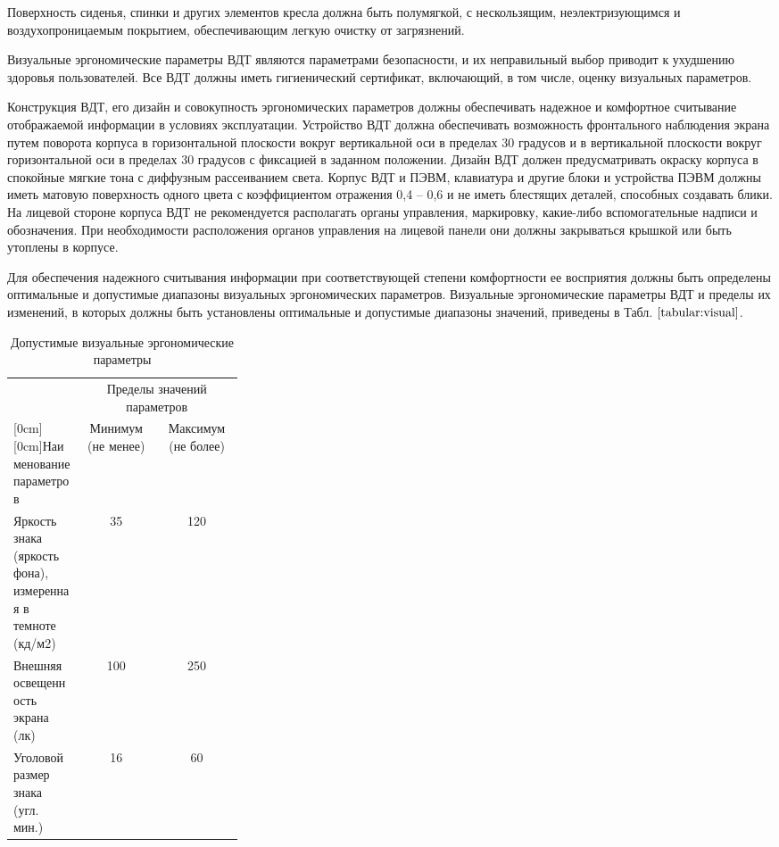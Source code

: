 \documentclass[12pt,a4paper]{report}
\begin{document}
Поверхность сиденья, спинки и других элементов кресла должна быть полумягкой, с нескользящим, неэлектризующимся и воздухопроницаемым покрытием, обеспечивающим легкую очистку от загрязнений. 

Визуальные эргономические параметры ВДТ являются параметрами безопасности, и их неправильный выбор приводит к ухудшению здоровья пользователей. Все ВДТ должны иметь гигиенический сертификат, включающий, в том числе, оценку визуальных параметров. 

Конструкция ВДТ, его дизайн и совокупность эргономических параметров должны обеспечивать надежное и комфортное считывание отображаемой информации в условиях эксплуатации. Устройство ВДТ должна обеспечивать возможность фронтального наблюдения экрана путем поворота корпуса в горизонтальной плоскости вокруг вертикальной оси в пределах  30 градусов и в вертикальной плоскости вокруг горизонтальной оси в пределах   30 градусов с фиксацией в заданном положении. Дизайн ВДТ должен предусматривать окраску корпуса в спокойные мягкие тона с диффузным рассеиванием света. Корпус ВДТ и ПЭВМ, клавиатура и другие блоки и устройства ПЭВМ должны иметь матовую поверхность одного цвета с коэффициентом отражения 0,4 – 0,6 и не иметь блестящих деталей, способных создавать блики. На лицевой стороне корпуса ВДТ не рекомендуется располагать органы управления, маркировку, какие-либо вспомогательные надписи и обозначения. При необходимости расположения органов управления на лицевой панели они должны закрываться крышкой или быть утоплены в корпусе.

Для обеспечения надежного считывания информации при соответствующей степени комфортности ее восприятия должны быть определены оптимальные и допустимые диапазоны визуальных эргономических параметров. Визуальные эргономические параметры ВДТ и пределы их изменений, в которых должны быть установлены оптимальные и допустимые диапазоны значений, приведены в Табл. $\ref{tabular:visual}$.

\begin{table} [H]
\label{tabular:visual}
\begin{center}
\begin{tabular}{|p{0.3\linewidth}|c|c|}
\hline
& \multicolumn{2}{c|}{Пределы значений параметров} \\
\cline{2-3}
\raisebox{1.5ex}[0cm][0cm]{Наименование параметров}
& Минимум (не менее) & Максимум (не более) \\
\hline
Яркость знака (яркость фона), измеренная в темноте (кд/м2)	& 35 & 120 \\
\hline
Внешняя освещенность экрана (лк) & 100 & 250 \\
\hline
Уголовой размер знака (угл. мин.) & 16 & 60 \\
\hline
\end{tabular}
\end{center}
\caption{Допустимые визуальные эргономические параметры}
\end{table}
\end{document}
